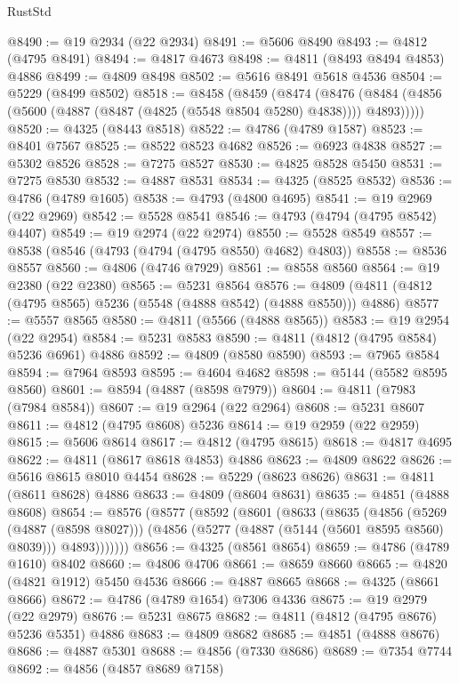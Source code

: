 \begin{lexlean}{RustStd}
\begin{coremodule}
{\begin{coremodule}
{{{{{{{{{{{{{{{{{{{{{{{{{{{{{{{{{{{{{{{{{{{{{{{{{{{{{{{{{{{{{{{{{{{{{{{{{{{{{{{{@8490 := @19 @2934 (@22 @2934)
@8491 := @5606 @8490
@8493 := @4812 (@4795 @8491)
@8494 := @4817 @4673
@8498 := @4811 (@8493 @8494 @4853) @4886
@8499 := @4809 @8498
@8502 := @5616 @8491 @5618 @4536
@8504 := @5229 (@8499 @8502)
@8518 := @8458
    (@8459
      (@8474
        (@8476 (@8484 (@4856 (@5600 (@4887 (@8487 (@4825 (@5548 @8504 @5280) @4838)))) @4893)))))
@8520 := @4325 (@8443 @8518)
@8522 := @4786 (@4789 @1587)
@8523 := @8401 @7567
@8525 := @8522 @8523 @4682
@8526 := @6923 @4838
@8527 := @5302 @8526
@8528 := @7275 @8527
@8530 := @4825 @8528 @5450
@8531 := @7275 @8530
@8532 := @4887 @8531
@8534 := @4325 (@8525 @8532)
@8536 := @4786 (@4789 @1605)
@8538 := @4793 (@4800 @4695)
@8541 := @19 @2969 (@22 @2969)
@8542 := @5528 @8541
@8546 := @4793 (@4794 (@4795 @8542) @4407)
@8549 := @19 @2974 (@22 @2974)
@8550 := @5528 @8549
@8557 := @8538 (@8546 (@4793 (@4794 (@4795 @8550) @4682) @4803))
@8558 := @8536 @8557
@8560 := @4806 (@4746 @7929)
@8561 := @8558 @8560
@8564 := @19 @2380 (@22 @2380)
@8565 := @5231 @8564
@8576 := @4809 (@4811 (@4812 (@4795 @8565) @5236 (@5548 (@4888 @8542) (@4888 @8550))) @4886)
@8577 := @5557 @8565
@8580 := @4811 (@5566 (@4888 @8565))
@8583 := @19 @2954 (@22 @2954)
@8584 := @5231 @8583
@8590 := @4811 (@4812 (@4795 @8584) @5236 @6961) @4886
@8592 := @4809 (@8580 @8590)
@8593 := @7965 @8584
@8594 := @7964 @8593
@8595 := @4604 @4682
@8598 := @5144 (@5582 @8595 @8560)
@8601 := @8594 (@4887 (@8598 @7979))
@8604 := @4811 (@7983 (@7984 @8584))
@8607 := @19 @2964 (@22 @2964)
@8608 := @5231 @8607
@8611 := @4812 (@4795 @8608) @5236
@8614 := @19 @2959 (@22 @2959)
@8615 := @5606 @8614
@8617 := @4812 (@4795 @8615)
@8618 := @4817 @4695
@8622 := @4811 (@8617 @8618 @4853) @4886
@8623 := @4809 @8622
@8626 := @5616 @8615 @8010 @4454
@8628 := @5229 (@8623 @8626)
@8631 := @4811 (@8611 @8628) @4886
@8633 := @4809 (@8604 @8631)
@8635 := @4851 (@4888 @8608)
@8654 := @8576
    (@8577
      (@8592
        (@8601
          (@8633
            (@8635
              (@4856
                (@5269 (@4887 (@8598 @8027)))
                (@4856 (@5277 (@4887 (@5144 (@5601 @8595 @8560) @8039))) @4893)))))))
@8656 := @4325 (@8561 @8654)
@8659 := @4786 (@4789 @1610) @8402
@8660 := @4806 @4706
@8661 := @8659 @8660
@8665 := @4820 (@4821 @1912) @5450 @4536
@8666 := @4887 @8665
@8668 := @4325 (@8661 @8666)
@8672 := @4786 (@4789 @1654) @7306 @4336
@8675 := @19 @2979 (@22 @2979)
@8676 := @5231 @8675
@8682 := @4811 (@4812 (@4795 @8676) @5236 @5351) @4886
@8683 := @4809 @8682
@8685 := @4851 (@4888 @8676)
@8686 := @4887 @5301
@8688 := @4856 (@7330 @8686)
@8689 := @7354 @7744
@8692 := @4856 (@4857 @8689 @7158)
}}}}}}}}}}}}}}}}}}}}}}}}}}}}}}}}}}}}}}}}}}}}}}}}}}}}}}}}}}}}}}}}}}}}}}}}}}}}}}}}
\end{coremodule}}
\end{coremodule}
\end{lexlean}
